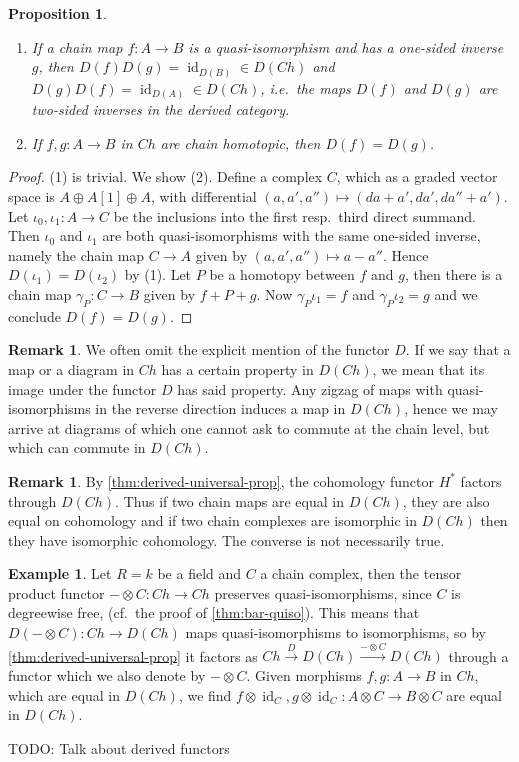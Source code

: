 \documentclass{scrartcl}
\theoremstyle{plain}
\newtheorem{proposition}[theorem]{Proposition}
\theoremstyle{definition}
\newtheorem{example}[theorem]{Example}
\newtheorem{remark}[theorem]{Remark}
\let\xto\xrightarrow
\DeclareMathOperator{\id}{id}
\newcommand{\blank}{-}
\begin{document}
\begin{proposition}
    \begin{enumerate}[(1)]
        \item If a chain map $f\colon A\to B$ is a quasi-isomorphism and has a one-sided inverse $g$, then $D(f)D(g) = \id_{D(B)}\in D(Ch)$ and $D(g)D(f)=\id_{D(A)}\in D(Ch)$, i.e.\ the maps $D(f)$ and $D(g)$ are two-sided inverses in the derived category.
        \item If $f, g\colon A\to B$ in $Ch$ are chain homotopic, then $D(f) = D(g)$.  
    \end{enumerate}
\end{proposition}
\begin{proof}
    (1) is trivial. We show (2). Define a complex $C$, which as a graded vector space is $A\oplus A[1]\oplus A$, with differential $(a, a', a'')\mapsto (da+a', da', da''+a')$. Let $\iota_{0}, \iota_1\colon A\to C$ be the inclusions into the first resp.\ third direct summand. Then $\iota_0$ and $\iota_1$ are both quasi-isomorphisms with the same one-sided inverse, namely the chain map $C\to A$ given by $(a, a', a'')\mapsto a-a''$. Hence $D(\iota_1) = D(\iota_2)$ by (1). Let $P$ be a homotopy between $f$ and $g$, then there is a chain map $\gamma_P\colon C\to B$ given by $f + P+ g$. Now $\gamma_P\iota_1 = f$ and $\gamma_P\iota_2=g$ and we conclude $D(f) = D(g)$.
\end{proof}

\begin{remark}
    We often omit the explicit mention of the functor $D$. If we say that a map or a diagram in $Ch$ has a certain property in $D(Ch)$, we mean that its image under the functor $D$ has said property. Any zigzag of maps with quasi-isomorphisms in the reverse direction induces a map in $D(Ch)$, hence we may arrive at diagrams of which one cannot ask to commute at the chain level, but which can commute in $D(Ch)$.
\end{remark}

\begin{remark}
    By \cref{thm:derived-universal-prop}, the cohomology functor $H^*$ factors through $D(Ch)$. Thus if two chain maps are equal in $D(Ch)$, they are also equal on cohomology and if two chain complexes are isomorphic in $D(Ch)$ then they have isomorphic cohomology. The converse is not necessarily true.
\end{remark}

\begin{example}
    Let $R=k$ be a field and $C$ a chain complex, then the tensor product functor $\blank\otimes C\colon Ch\to Ch$ preserves quasi-isomorphisms, since $C$ is degreewise free, (cf.\ the proof of \cref{thm:bar-quiso}). This means that $D(\blank\otimes C)\colon Ch\to D(Ch)$ maps quasi-isomorphisms to isomorphisms, so by \cref{thm:derived-universal-prop} it factors as $Ch \xto{D} D(Ch)\xto{\blank\otimes C} D(Ch)$ through a functor which we also denote by $\blank\otimes C$. Given morphisms $f, g\colon A\to B$ in $Ch$, which are equal in $D(Ch)$, we find $f\otimes \id_C, g\otimes\id_C\colon A\otimes C\to B\otimes C$ are equal in $D(Ch)$.

    TODO: Talk about derived functors
\end{example}
\end{document}
